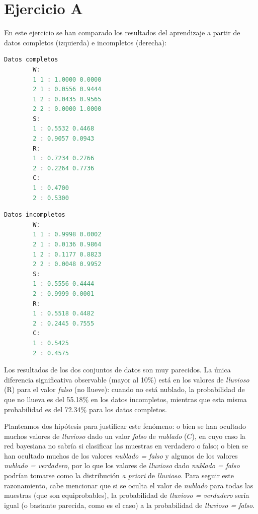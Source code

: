 \documentclass[a4paper]{article}
\begin{document}
\section{Ejercicio A}
\quad En este ejercicio se han comparado los resultados del aprendizaje a partir de datos completos (izquierda) e incompletos (derecha):

    \begin{table}[h!]
      \noindent \begin{minipage}{.45\columnwidth}
        \begin{lstlisting}[language=octave]
		Datos completos
		W:
		1 1 : 1.0000 0.0000 
		2 1 : 0.0556 0.9444 
		1 2 : 0.0435 0.9565 
		2 2 : 0.0000 1.0000 
		S:
		1 : 0.5532 0.4468 
		2 : 0.9057 0.0943 
		R:
		1 : 0.7234 0.2766 
		2 : 0.2264 0.7736 
		C:
		1 : 0.4700 
		2 : 0.5300 
		\end{lstlisting}
      \end{minipage}\hfill
      \begin{minipage}{.6\columnwidth}
      	\begin{lstlisting}[language=octave, xleftmargin=1cm, xrightmargin=1cm]
		Datos incompletos
		W:
		1 1 : 0.9998 0.0002 
		2 1 : 0.0136 0.9864 
		1 2 : 0.1177 0.8823 
		2 2 : 0.0048 0.9952 
		S:
		1 : 0.5556 0.4444 
		2 : 0.9999 0.0001 
		R:
		1 : 0.5518 0.4482 
		2 : 0.2445 0.7555 
		C:
		1 : 0.5425 
		2 : 0.4575 
		\end{lstlisting}
      \end{minipage}
    \end{table}
\begin{center}
\end{center}

\quad Los resultados de los dos conjuntos de datos son muy parecidos. La única diferencia significativa observable (mayor al 10\%) está en los valores de \textit{lluvioso} (R) para el valor \textit{falso} (no llueve): cuando no está nublado, la probabilidad de que no llueva es del 55.18\% en los datos incompletos, mientras que esta misma probabilidad es del 72.34\% para los datos completos.

\quad Planteamos dos hipótesis para justificar este fenómeno: o bien se han ocultado muchos valores de \textit{lluvioso} dado un valor \textit{falso} de \textit{nublado} ($C$), en cuyo caso la red bayesiana no sabría si clasificar las muestras en verdadero o falso; o bien se han ocultado muchos de los valores \textit{nublado = falso} y algunos de los valores \textit{nublado = verdadero}, por lo que los valores de \textit{lluvioso} dado \textit{nublado = falso} podrían tomarse como la distribución \textit{a priori} de \textit{lluvioso}. Para seguir este razonamiento, cabe mencionar que si se oculta el valor de \textit{nublado} para todas las muestras (que son equiprobables), la probabilidad de \textit{lluvioso = verdadero} sería igual (o bastante parecida, como es el caso) a la probabilidad de \textit{lluvioso = falso}.
\end{document}
